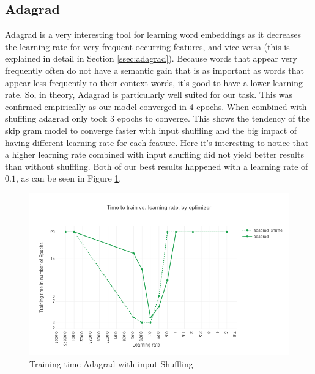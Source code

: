 \subsection{Adagrad}
Adagrad \cite{adagrad} is a very interesting tool for learning word embeddings as it decreases the learning rate for very frequent occurring features, and vice versa (this is explained in detail in Section \ref{ssec:adagrad}). Because words that appear very frequently often do not have a semantic gain that is as important as words that appear less frequently to their context words, it's good to have a lower learning rate. So, in theory, Adagrad is particularly well suited for our task. This was confirmed empirically as our model converged in 4 epochs. When combined with shuffling adagrad only took 3 epochs to converge. This shows the tendency of the skip gram model to converge faster with input shuffling and the big impact of having different learning rate for each feature. 
Here it's interesting to notice that a higher learning rate combined with input shuffling did not yield better results than without shuffling. Both of our best results happened with a learning rate of $0.1$, as can be seen in Figure \ref{fig:results_adagrad_shuffle}.
\begin{figure}[h]
    \centering
            \includegraphics[scale=0.45]{images/results_adagrad_shuffle} 
    \caption{Training time Adagrad with input Shuffling}
    \label{fig:results_adagrad_shuffle}
\end{figure}
